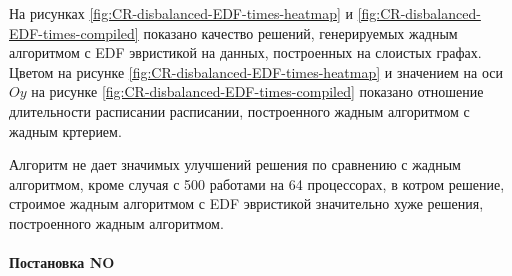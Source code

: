 На рисунках \ref{fig:CR-disbalanced-EDF-times-heatmap} и \ref{fig:CR-disbalanced-EDF-times-compiled} показано качество решений, генерируемых жадным алгоритмом с EDF эвристикой на данных, построенных на слоистых графах. Цветом на рисунке \ref{fig:CR-disbalanced-EDF-times-heatmap} и значением на оси $Oy$ на рисунке \ref{fig:CR-disbalanced-EDF-times-compiled} показано отношение длительности расписании расписании, построенного жадным алгоритмом с жадным кртерием.

Алгоритм не дает значимых улучшений решения по сравнению с жадным алгоритмом, кроме случая с 500 работами на 64 процессорах, в котром решение, строимое жадным алгоритмом с EDF эвристикой значительно хуже решения, построенного жадным алгоритмом.


\paragraph{Постановка NO}

